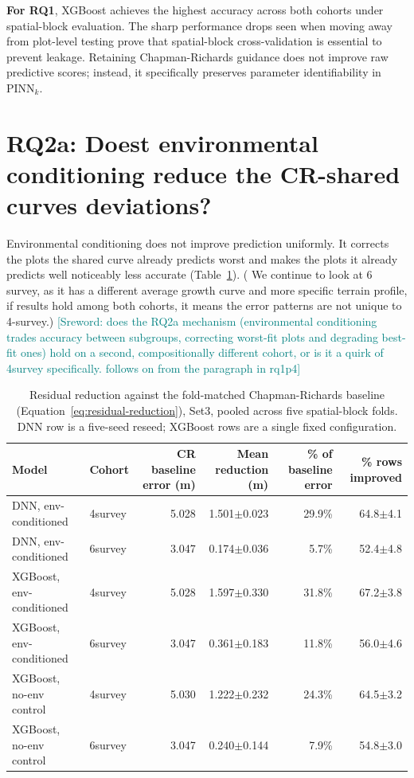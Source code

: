 \documentclass[logo,msc,ai]{infthesis}           %
\newcommand{\sr}[1]{\textcolor{teal}{[Sreword: #1]}}
\begin{document}
\textbf{For RQ1}, XGBoost achieves the highest accuracy across both cohorts under spatial-block evaluation. The sharp performance drops seen when moving away from plot-level testing prove that spatial-block cross-validation is essential to prevent leakage. Retaining Chapman-Richards guidance does not improve raw predictive scores; instead, it specifically preserves parameter identifiability in $\text{PINN}_k$.




\section{RQ2a: Doest environmental conditioning reduce the CR-shared curves deviations?}
Environmental conditioning does not improve prediction uniformly. It corrects the
plots the shared curve already predicts worst and makes the plots it already predicts
well noticeably less accurate (Table~\ref{tab:results-rq2a}). ( We continue to look at 6 survey, as it has a different average growth curve and more specific terrain profile, if results hold among both cohorts, it means the error patterns are not unique to 4-survey.) \sr{does the RQ2a mechanism (environmental conditioning trades accuracy between subgroups, correcting worst-fit plots and degrading best-fit ones) hold on a second, compositionally different cohort, or is it a quirk of 4survey specifically. follows on from the paragraph in rq1p4}

\begin{table}[!htbp]
\centering
\scriptsize
\renewcommand{\arraystretch}{1.2}
\begin{tabular}{llrrrr}
\toprule
Model & Cohort & CR baseline error (m) & Mean reduction (m) & \% of baseline error & \% rows improved \\
\midrule
DNN, env-conditioned & 4survey & 5.028 & 1.501$\pm$0.023 & 29.9\% & 64.8$\pm$4.1 \\
DNN, env-conditioned & 6survey & 3.047 & 0.174$\pm$0.036 & 5.7\% & 52.4$\pm$4.8 \\
XGBoost, env-conditioned & 4survey & 5.028 & 1.597$\pm$0.330 & 31.8\% & 67.2$\pm$3.8 \\
XGBoost, env-conditioned & 6survey & 3.047 & 0.361$\pm$0.183 & 11.8\% & 56.0$\pm$4.6 \\
XGBoost, no-env control & 4survey & 5.030 & 1.222$\pm$0.232 & 24.3\% & 64.5$\pm$3.2 \\
XGBoost, no-env control & 6survey & 3.047 & 0.240$\pm$0.144 & 7.9\% & 54.8$\pm$3.0 \\
\bottomrule
\end{tabular}
\caption{Residual reduction against the fold-matched Chapman-Richards baseline
(Equation~\ref{eq:residual-reduction}), Set3, pooled across five spatial-block folds.
DNN row is a five-seed reseed; XGBoost rows are a single fixed configuration.}
\label{tab:results-rq2a} %
\end{table}
\end{document}

